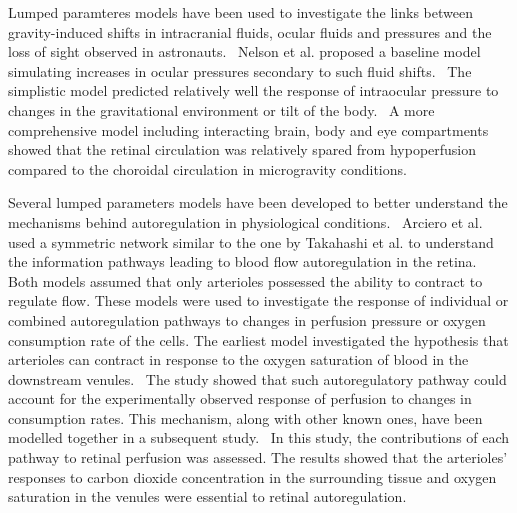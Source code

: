 \documentclass[12pt,a4paper]{journal}
\begin{document}
Lumped paramteres models have been used to investigate the links between gravity-induced shifts in intracranial fluids, ocular fluids and pressures and the loss of sight observed in astronauts.~\cite{Nelson_2017,Petersen_2022,Salerni_2019}
Nelson et al. proposed a baseline model simulating increases in ocular pressures secondary to such fluid shifts.~\cite{Nelson_2017}
The simplistic model predicted relatively well the response of intraocular pressure to changes in the gravitational environment or tilt of the body.~\cite{Nelson_2017,Petersen_2022}
A more comprehensive model including interacting brain, body and eye compartments showed that the retinal circulation was relatively spared from hypoperfusion compared to the choroidal circulation in microgravity conditions.~\cite{Salerni_2019}

Several lumped parameters models have been developed to better understand the mechanisms behind autoregulation in physiological conditions.~\cite{Arciero_2008,Arciero_2013,Guidoboni_2014a}
Arciero et al. used a symmetric network similar to the one by Takahashi et al. to understand the information pathways leading to blood flow autoregulation in the retina.~\cite{Arciero_2008,Arciero_2013}
Both models assumed that only arterioles possessed the ability to contract to regulate flow.
These models were used to investigate the response of individual or combined autoregulation pathways to changes in perfusion pressure or oxygen consumption rate of the cells.
The earliest model investigated the hypothesis that arterioles can contract in response to the oxygen saturation of blood in the downstream venules.~\cite{Arciero_2008}
The study showed that such autoregulatory pathway could account for the experimentally observed response of perfusion to changes in consumption rates.
This mechanism, along with other known ones, have been modelled together in a subsequent study.~\cite{Arciero_2013}
In this study, the contributions of each pathway to retinal perfusion was assessed.
The results showed that the arterioles' responses to carbon dioxide concentration in the surrounding tissue and oxygen saturation in the venules were essential to retinal autoregulation.~\cite{Arciero_2013}
\end{document}
